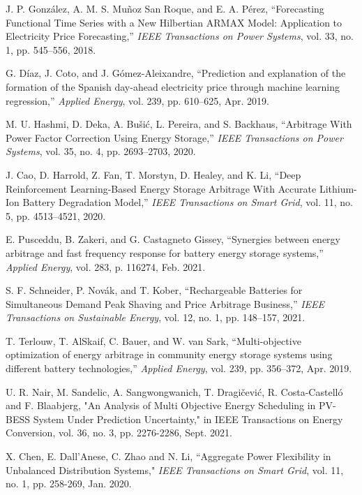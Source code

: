 \documentclass[journal]{IEEEtran}
\begin{document}
\begin{thebibliography}{2}
J. P. González, A. M. S. Muñoz San Roque, and E. A. Pérez, “Forecasting Functional Time Series with a New Hilbertian ARMAX Model: Application to Electricity Price Forecasting,” \emph{IEEE Transactions on Power Systems}, vol. 33, no. 1, pp. 545–556, 2018.

G. Díaz, J. Coto, and J. Gómez-Aleixandre, “Prediction and explanation of the formation of the Spanish day-ahead electricity price through machine learning regression,” \emph{Applied Energy}, vol. 239, pp. 610–625, Apr. 2019.

M. U. Hashmi, D. Deka, A. Bušić, L. Pereira, and S. Backhaus, “Arbitrage With Power Factor Correction Using Energy Storage,” \emph{IEEE Transactions on Power Systems}, vol. 35, no. 4, pp. 2693–2703, 2020.

J. Cao, D. Harrold, Z. Fan, T. Morstyn, D. Healey, and K. Li, “Deep Reinforcement Learning-Based Energy Storage Arbitrage With Accurate Lithium-Ion Battery Degradation Model,” \emph{IEEE Transactions on Smart Grid}, vol. 11, no. 5, pp. 4513–4521, 2020.

E. Pusceddu, B. Zakeri, and G. Castagneto Gissey, “Synergies between energy arbitrage and fast frequency response for battery energy storage systems,” \emph{Applied Energy}, vol. 283, p. 116274, Feb. 2021.

S. F. Schneider, P. Novák, and T. Kober, “Rechargeable Batteries for Simultaneous Demand Peak Shaving and Price Arbitrage Business,” \emph{IEEE Transactions on Sustainable Energy}, vol. 12, no. 1, pp. 148–157, 2021.

T. Terlouw, T. AlSkaif, C. Bauer, and W. van Sark, “Multi-objective optimization of energy arbitrage in community energy storage systems using different battery technologies,” \emph{Applied Energy}, vol. 239, pp. 356–372, Apr. 2019.

U. R. Nair, M. Sandelic, A. Sangwongwanich, T. Dragičević, R. Costa-Castelló and F. Blaabjerg, "An Analysis of Multi Objective Energy Scheduling in PV-BESS System Under Prediction Uncertainty," in IEEE Transactions on Energy Conversion, vol. 36, no. 3, pp. 2276-2286, Sept. 2021.

X. Chen, E. Dall’Anese, C. Zhao and N. Li, “Aggregate Power Flexibility in Unbalanced Distribution Systems," \emph{IEEE Transactions on Smart Grid}, vol. 11, no. 1, pp. 258-269, Jan. 2020.


\end{thebibliography}
\end{document}

